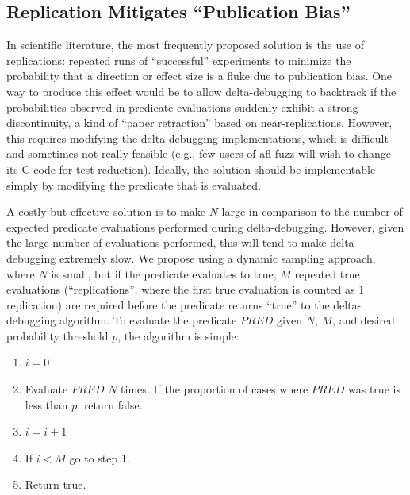 \subsection{Replication Mitigates  ``Publication Bias''}

In scientific literature, the most frequently proposed solution is the
use of replications:  repeated runs of ``successful'' experiments to
minimize the probability that a direction or effect size is a fluke due to publication
bias.  One way to produce this effect would be to allow
delta-debugging to backtrack if the probabilities observed in predicate
evaluations suddenly exhibit a strong discontinuity, a kind of ``paper
retraction'' based on near-replications.  However, this requires
modifying the delta-debugging implementations, which is difficult and
sometimes not really feasible (e.g., few users of afl-fuzz \cite{aflfuzz} will wish
to change its C code for test reduction).  Ideally, the solution
should be implementable simply by modifying the predicate that is
evaluated.  

A costly but effective solution is to make $N$ large in comparison to
the number of expected predicate evaluations performed during
delta-debugging.  However, given the large number of evaluations performed,
this will tend to make delta-debugging extremely slow.  We propose
using a dynamic sampling approach, where $N$ is small, but if the
predicate evaluates to true, $M$ repeated true evaluations
(``replications'', where the first true evaluation is counted as 1 replication) are
required before the predicate returns ``true'' to the delta-debugging
algorithm.  To evaluate the predicate $\mathit{PRED}$ given $N$,
$M$, and desired probability threshold $p$, the algorithm is simple:

\begin{enumerate}
  \item  $i = 0$
  \item Evaluate $\mathit{PRED}$ $N$ times.  If the proportion of cases
  where $\mathit{PRED}$ was true is less than $p$, return false.
  \item  $i = i + 1$
  \item If $i < M$ go to step 1.
  \item  Return true.
\end{enumerate}

